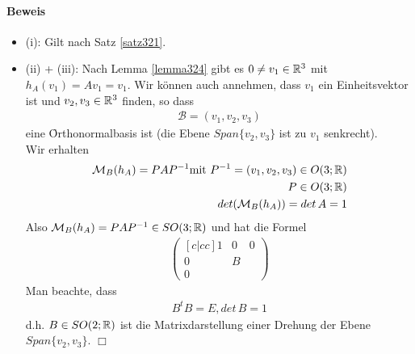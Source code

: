 \paragraph{Beweis}
\begin{itemize}
\item (i): Gilt nach Satz \ref{satz321}.
\item (ii) + (iii):
Nach Lemma \ref{lemma324} gibt es $0 \neq v_1 \in \mathbb{R}^3$ mit $h_A(v_1) = Av_1 = v_1.$
Wir können auch annehmen, dass $v_1$ ein Einheitsvektor ist und $v_2, v_3 \in \mathbb{R}^3$ finden, so dass
\begin{align}
\mathcal{B} = (v_1, v_2, v_3)
\end{align}
eine \f{Orthonormalbasis} ist (die Ebene $Span\{v_2, v_3\}$ ist zu $v_1$ senkrecht).\\
Wir erhalten 
\begin{align}
\mathcal{M}_B (h_A) = PAP^{-1}
\text{mit } P^{-1} = (v_1, v_2, v_3) \in O(3; \mathbb{R}) \\
P \in O(3; \mathbb{R}) \\
det(\mathcal{M}_B(h_A)) = det\, A = 1
\end{align}
Also $\mathcal{M}_B(h_A) = PAP^{-1} \in SO(3; \mathbb{R})$ und hat die Formel
\begin{align}
\begin{pmatrix}[c|cc] 1 & 0 & 0 \\ \hline 0 & B & \\ 0 & & \end{pmatrix}
\end{align}
Man beachte, dass
\begin{align}
B^t B = E, det\, B = 1
\end{align}
d.h. $B \in SO(2; \mathbb{R})$ ist die Matrixdarstellung einer Drehung der Ebene $Span\{v_2, v_3\}$.
\hspace*{1cm} \hfill $\Box$
\end{itemize}

